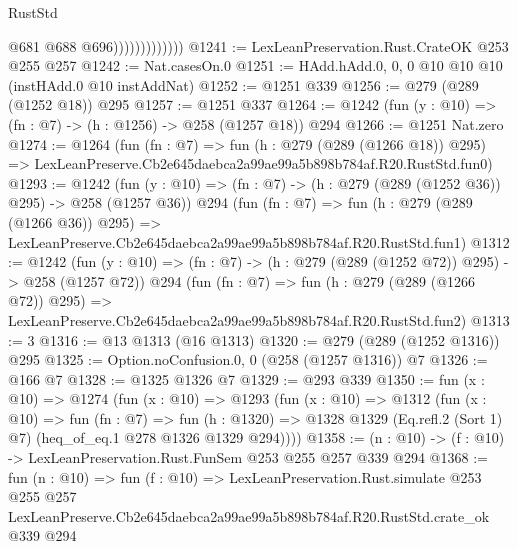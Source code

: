 \begin{lexlean}{RustStd}
\begin{coremodule}
                              @681
                              @688
                              @696)))))))))))))
@1241 := LexLeanPreservation.Rust.CrateOK @253 @255 @257
@1242 := Nat.casesOn.{0}
@1251 := HAdd.hAdd.{0, 0, 0} @10 @10 @10 (instHAdd.{0} @10 instAddNat)
@1252 := @1251 @339
@1256 := @279 (@289 (@1252 @18)) @295
@1257 := @1251 @337
@1264 := @1242 (fun (y : @10) => (fn : @7) -> (h : @1256) -> @258 (@1257 @18)) @294
@1266 := @1251 Nat.zero
@1274 := @1264
    (fun (fn : @7) =>
    fun (h : @279 (@289 (@1266 @18)) @295) =>
    LexLeanPreserve.Cb2e645daebca2a99ae99a5b898b784af.R20.RustStd.fun0)
@1293 := @1242
    (fun (y : @10) => (fn : @7) -> (h : @279 (@289 (@1252 @36)) @295) -> @258 (@1257 @36))
    @294
    (fun (fn : @7) =>
    fun (h : @279 (@289 (@1266 @36)) @295) =>
    LexLeanPreserve.Cb2e645daebca2a99ae99a5b898b784af.R20.RustStd.fun1)
@1312 := @1242
    (fun (y : @10) => (fn : @7) -> (h : @279 (@289 (@1252 @72)) @295) -> @258 (@1257 @72))
    @294
    (fun (fn : @7) =>
    fun (h : @279 (@289 (@1266 @72)) @295) =>
    LexLeanPreserve.Cb2e645daebca2a99ae99a5b898b784af.R20.RustStd.fun2)
@1313 := 3
@1316 := @13 @1313 (@16 @1313)
@1320 := @279 (@289 (@1252 @1316)) @295
@1325 := Option.noConfusion.{0, 0} (@258 (@1257 @1316)) @7
@1326 := @166 @7
@1328 := @1325 @1326 @7
@1329 := @293 @339
@1350 := fun (x : @10) =>
  @1274
    (fun (x : @10) =>
    @1293
      (fun (x : @10) =>
      @1312
        (fun (x : @10) =>
        fun (fn : @7) =>
        fun (h : @1320) =>
        @1328 @1329 (Eq.refl.{2} (Sort 1) @7) (heq_of_eq.{1} @278 @1326 @1329 @294))))
@1358 := (n : @10) -> (f : @10) -> LexLeanPreservation.Rust.FunSem @253 @255 @257 @339 @294
@1368 := fun (n : @10) =>
  fun (f : @10) =>
  LexLeanPreservation.Rust.simulate
    @253
    @255
    @257
    LexLeanPreserve.Cb2e645daebca2a99ae99a5b898b784af.R20.RustStd.crate_ok
    @339
    @294
\end{coremodule}
\end{lexlean}
